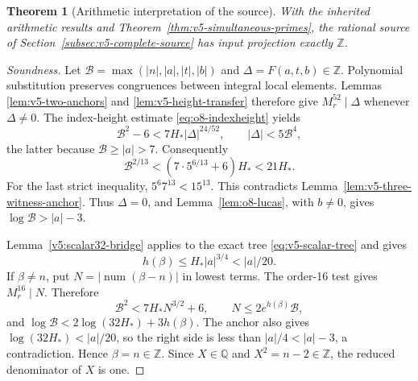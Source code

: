 \documentclass[11pt]{article}
\newtheorem{theorem}{Theorem}[section]
\theoremstyle{definition}
\theoremstyle{remark}
\newcommand{\Q}{\mathbb Q}
\newcommand{\Z}{\mathbb Z}
\begin{document}
\begin{theorem}[Arithmetic interpretation of the source]
\label{thm:v5-source-projection}
With the inherited arithmetic results and
Theorem~\ref{thm:v5-simultaneous-primes}, the rational source of
Section~\ref{subsec:v5-complete-source} has input projection exactly $\Z$.
\end{theorem}
\begin{proof}[Soundness]
Let $\mathcal B=\max(|n|,|a|,|t|,|b|)$ and
$\Delta=F(a,t,b)\in\Z$. Polynomial substitution preserves
congruences between integral local elements. Lemmas
\ref{lem:v5-two-anchors} and \ref{lem:v5-height-transfer} therefore
give $M_r^{52}\mid\Delta$ whenever $\Delta\ne0$.
The index-height estimate \eqref{eq:o8-indexheight} yields
\[
 \mathcal B^2-6<7H_*|\Delta|^{24/52},\qquad
 |\Delta|<5\mathcal B^4,
\]
the latter because $\mathcal B\ge|a|>7$. Consequently
\[
 \mathcal B^{2/13}<(7\cdot5^{6/13}+6)H_*<21H_*.
\]
For the last strict inequality, $5^6 7^{13}<15^{13}$.
This contradicts Lemma~\ref{lem:v5-three-witness-anchor}. Thus
$\Delta=0$, and Lemma~\ref{lem:o8-lucas}, with $b\ne0$, gives
$\log\mathcal B>|a|-3$.

Lemma~\ref{v5:scalar32-bridge} applies to the exact tree
\eqref{eq:v5-scalar-tree} and gives
\[
 h(\beta)\le H_*|a|^{3/4}<|a|/20.
\]
If $\beta\ne n$, put $N=|\operatorname{num}(\beta-n)|$ in lowest
terms. The order-16 test gives $M_r^{16}\mid N$. Therefore
\[
 \mathcal B^2<7H_*N^{3/2}+6,\qquad
 N\le2e^{h(\beta)}\mathcal B,
\]
and $\log\mathcal B<2\log(32H_*)+3h(\beta)$.
The anchor also gives $\log(32H_*)<|a|/20$, so the right side
is less than $|a|/4<|a|-3$, a contradiction. Hence
$\beta=n\in\Z$. Since $X\in\Q$ and $X^2=n-2\in\Z$,
the reduced denominator of $X$ is one.
\end{proof}
\end{document}
